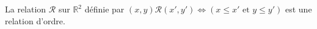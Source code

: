 La relation $\mathcal R$ sur $\mathbb R^2$ définie par $(x,y) \mathcal R (x',y') \iff (x\leq x' \text{ et } y\leq y')$ est une relation d'ordre.

\begin{reponses}
\end{reponses}


